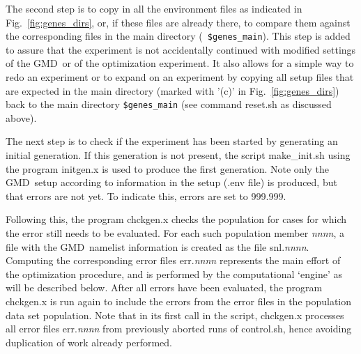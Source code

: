 \documentclass[12pt]{article}
\newcommand{\gmd}{GMD}
\newcommand{\file}{\sf}
\newcommand{\code}{\tt}
\begin{document}
The second step is to copy in all the environment files as indicated in
Fig.~\ref{fig:genes_dirs}, or, if these files are already there, to compare
them against the corresponding files in the main directory ({\code
\$genes\_main}). This step is added to assure that the experiment is not
accidentally continued with modified settings of the \gmd\ or of the
optimization experiment. It also allows for a simple way to redo an experiment
or to expand on an experiment by copying all setup files that are expected in
the main directory (marked with '(c)' in Fig.~\ref{fig:genes_dirs}) back to
the main directory {\code \$genes\_main} (see command {\file reset.sh} as
discussed above).

The next step is to check if the experiment has been started by generating an
initial generation. If this generation is not present, the script {\file
make\_init.sh} using the program {\file initgen.x} is used to produce the
first generation. Note only the \gmd\ setup according to information in the
setup ({\file *.env} file) is produced, but that errors are not yet. To
indicate this, errors are set to 999.999.

Following this, the program {\file chckgen.x} checks the population for cases
for which the error still needs to be evaluated. For each such population
member {\file \it nnnn}, a file with the \gmd\ namelist information is created
as the file {\file snl.{\it nnnn}}. Computing the corresponding error files
{\file err.{\it nnnn}} represents the main effort of the optimization
procedure, and is performed by the computational `engine' as will be described
below. After all errors have been evaluated, the program {\file chckgen.x} is
run again to include the errors from the error files in the population data
set {\file population}. Note that in its first call in the script, {\file
chckgen.x} processes all error files {\file err.{\it nnnn}} from previously
aborted runs of {\file control.sh}, hence avoiding duplication of work already
performed.
\end{document}
